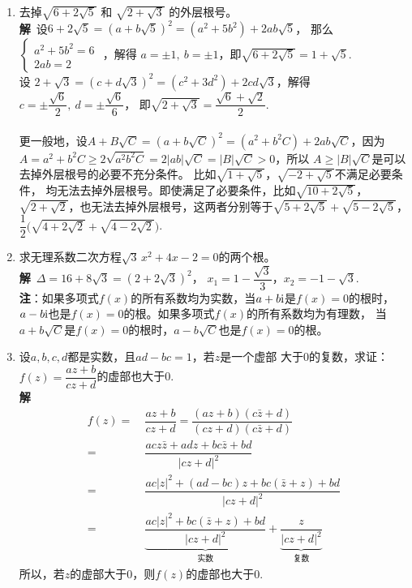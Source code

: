 \begin{enumerate}[label={【\textbf{例\thechapter.\arabic*}】},
 leftmargin=\inteval{\myenumleftmargin}pt,
 itemsep=\inteval{\myenumitempsep}pt,
 itemindent=\inteval{\myenumitemindent}pt]
\item 去掉$ \sqrt{6+2\sqrt{5}} $ 和 $ \sqrt{2+\sqrt{3}} $ 
的外层根号。\\
\textbf{解}\ 设$ 6+2\sqrt{5}=(a+b\sqrt{5})^2=(a^2+5b^2)+2ab\sqrt{5}$，
那么
$ \begin{cases}
    a^2+5b^2 = 6 \\
    2ab = 2
\end{cases} $ ，解得
$ a=\pm 1,\ b=\pm 1 $，即$ \sqrt{6+2\sqrt{5}}=1+\sqrt{5} $. \\
设 $ 2+\sqrt{3}=(c+d\sqrt{3})^2=(c^2+3d^2)+
2cd\sqrt{3} $，解得$ c=\pm \dfrac{\sqrt{6}}{2},\ d=\pm \dfrac{\sqrt{6}}{6} $，
即$  \sqrt{2+\sqrt{3}} = \dfrac{\sqrt{6}+\sqrt{2}}{2} $.  \\
\\
更一般地，设$ A+B\sqrt{C}=(a+b\sqrt{C})^2=(a^2+b^2C)+2ab\sqrt{C} $，因为
$ A=a^2+b^2C \geq 2\sqrt{a^2b^2C} =2|ab|\sqrt{C}=|B|\sqrt{C}>0 $，所以
$ A\geq |B|\sqrt{C} $是可以去掉外层根号的必要不充分条件。
比如$ \sqrt{1+\sqrt{5}} $，$ \sqrt{-2+\sqrt{5}} $不满足必要条件，
均无法去掉外层根号。即使满足了必要条件，比如$ \sqrt{10+2\sqrt{5}} $，
$ \sqrt{2+\sqrt{2}} $，也无法去掉外层根号，这两者分别等于$ \sqrt{5+2\sqrt{5}}+
\sqrt{5-2\sqrt{5}} $，$ \dfrac{1}{2}\bigl(\sqrt{4+2\sqrt{2}}+
\sqrt{4-2\sqrt{2}}\bigr) $. 

\item 求无理系数二次方程$ \sqrt{3}\, x^2+4x-2=0 $的两个根。\\
\textbf{解}\ $ \Delta=16+8\sqrt{3}=(2+2\sqrt{3})^2 $，
$ x_1=1-\dfrac{\sqrt{3}}{3} $，$ x_2=-1-\sqrt{3} $. \\
\textbf{注}：如果多项式$ f(x) $的所有系数均为实数，当$ a+b\mathrm{i} $是$ f(x)=0 $的根时，
$ a-b\mathrm{i} $也是$ f(x)=0 $的根。如果多项式$ f(x) $的所有系数均为有理数，
当$ a+b\sqrt{C} $是$ f(x)=0 $的根时，$ a-b\sqrt{C} $也是$ f(x)=0 $的根。

\item 设$a,b,c,d$都是实数，且$ad-bc=1$，若$z$是一个虚部
大于0的复数，求证：$f(z)=\dfrac{az+b}{cz+d}$的虚部也大于0. \\
\textbf{解}\ 
\begin{align*}
    f(z) =&\ \dfrac{az+b}{cz+d}=
    \dfrac{(az+b)(c\bar{z}+d)}{(cz+d)(c\bar{z}+d)} \\
    =&\ \dfrac{acz\bar{z}+adz+bc\bar{z}+bd}{|cz+d|^2} \\
    =&\ \dfrac{ac|z|^2+(ad-bc)z+bc(\bar{z}+z)+bd}{|cz+d|^2} \\
    =&\ \underbrace{\dfrac{ac|z|^2+bc(\bar{z}+z)+bd}
        {|cz+d|^2}}_{\text{实数}} +
    \underbrace{\dfrac{z}{|cz+d|^2}}_{\text{复数}}    
\end{align*}
所以，若$z$的虚部大于0，则$f(z)$的虚部也大于0.


\end{enumerate}
